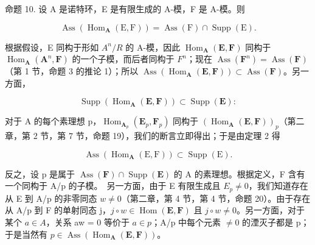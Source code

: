 命题 10. 设 A 是诺特环，E 是有限生成的 A-模，F 是 A-模。则

\[
\operatorname{Ass} \left(\operatorname{Hom} _ {\mathbf {A}} (\mathrm{E}, \mathrm{F})\right) = \operatorname{Ass} (\mathrm{F}) \cap \operatorname{Supp} (\mathrm{E}).\tag{5}
\]

根据假设，E 同构于形如 \(A^{n}/R\) 的 A-模，因此 \(\operatorname{Hom}_{\mathbf{A}}(\mathbf{E}, \mathbf{F})\) 同构于 \(\operatorname{Hom}_{\mathbf{A}}(\mathbf{A}^{n}, \mathbf{F})\) 的一个子模，而后者同构于 \(F^{n}\)；现在 \(\operatorname{Ass}(\mathbf{F}^{n}) = \operatorname{Ass}(\mathbf{F})\)（第 1 节，命题 3 的推论 1）；所以 \(\operatorname{Ass}(\operatorname{Hom}_{\mathbf{A}}(\mathbf{E}, \mathbf{F})) \subset \operatorname{Ass}(\mathbf{F})\)。另一方面，

\[
\operatorname{Supp} (\operatorname{Hom} _ {\mathbf {A}} (\mathbf {E}, \mathbf {F})) \subset \operatorname{Supp} (\mathbf {E}):
\]

对于 A 的每个素理想 p，\(\operatorname{Hom}_{\mathbf{A}_{p}}(\mathbf{E}_{p}, \mathbf{F}_{p})\) 同构于 \((\operatorname{Hom}_{\mathbf{A}}(\mathbf{E}, \mathbf{F}))_{p}\)（第二章，第 2 节，第 7 节，命题 19），我们的断言立即得出；于是由定理 2 得

\[
\operatorname{Ass} \left(\operatorname{Hom} _ {\mathbf {A}} (\mathrm{E}, \mathrm{F})\right) \subset \operatorname{Supp} (\mathrm{E}).
\]

反之，设 p 是属于 \(\operatorname{Ass}(\mathbf{F}) \cap \operatorname{Supp}(\mathbf{E})\) 的 A 的素理想。根据定义，F 含有一个同构于 A/p 的子模。~另一方面，由于 E 有限生成且 \(E_{p} \neq 0\)，我们知道存在从 E 到 A/p 的非零同态 \(w \neq 0\)（第二章，第 4 节，第 4 节，命题 20）。由于存在从 A/p 到 F 的单射同态 j，\(j \circ w \in \operatorname{Hom}(\mathbf{E}, \mathbf{F})\) 且 \(j \circ w \neq 0\)。另一方面，对于某个 \(a \in A\)，关系 aw = 0 等价于 \(a \in p\)；A/p 中每个元素 \(\neq 0\) 的湮灭子都是 p；于是当然有 \(p \in \operatorname{Ass}(\operatorname{Hom}_{\mathbf{A}}(\mathbf{E}, \mathbf{F}))\)。

